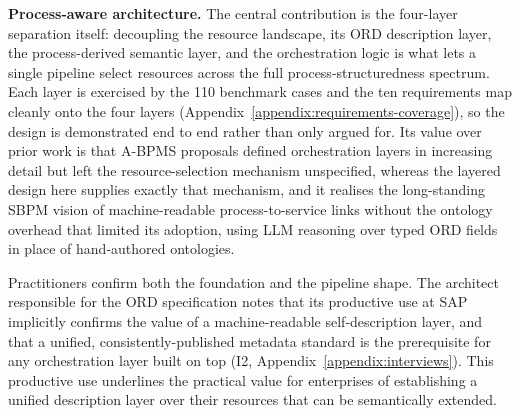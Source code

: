 \documentclass[10pt,twocolumn]{article}
\begin{document}
\textbf{Process-aware architecture.} The central contribution is the four-layer separation itself: decoupling the resource landscape, its ORD description layer, the process-derived semantic layer, and the orchestration logic is what lets a single pipeline select resources across the full process-structuredness spectrum. Each layer is exercised by the 110 benchmark cases and the ten requirements map cleanly onto the four layers (Appendix~\ref{appendix:requirements-coverage}), so the design is demonstrated end to end rather than only argued for. Its value over prior work is that A-BPMS proposals \citep{dumas_agentic_2026,adimulam_orchestration_2026} defined orchestration layers in increasing detail but left the resource-selection mechanism unspecified, whereas the layered design here supplies exactly that mechanism, and it realises the long-standing SBPM vision of machine-readable process-to-service links \citep{pedrinaci_semantic_2008} without the ontology overhead that limited its adoption, using LLM reasoning over typed ORD fields in place of hand-authored ontologies.

Practitioners confirm both the foundation and the pipeline shape. The architect responsible for the ORD specification notes that its productive use at SAP implicitly confirms the value of a machine-readable self-description layer, and that a unified, consistently-published metadata standard is the prerequisite for any orchestration layer built on top (I2, Appendix~\ref{appendix:interviews}). This productive use underlines the practical value for enterprises of establishing a unified description layer over their resources that can be semantically extended.
\end{document}
